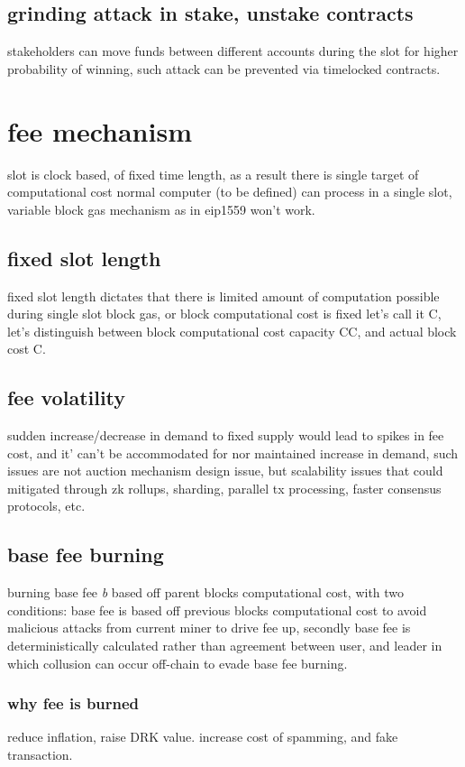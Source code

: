 \documentclass[a4paper]{article}
\begin{document}
\label{timelocked}
\subsection {grinding attack in stake, unstake contracts}
stakeholders can move funds between different accounts during the slot for higher probability of winning, such attack can be prevented via timelocked contracts.


\section {fee mechanism}
slot is clock based, of fixed time length, as a result there is single target of computational cost normal computer (to be defined) can process in a single slot, variable block gas mechanism as in eip1559 won't work.

\subsection{ fixed slot length}
fixed slot length dictates that there is limited amount of computation possible during single slot block gas, or block computational cost is fixed let's call it C, let's distinguish between block computational cost capacity CC, and actual block cost C.

\subsection{fee volatility}
sudden increase/decrease in demand to fixed supply would lead to spikes in fee cost, and it' can't be accommodated for nor maintained increase in demand, such issues are not auction mechanism design issue, but scalability issues that could mitigated through zk rollups, sharding, parallel tx processing, faster consensus protocols, etc.

\subsection{ base fee burning}
burning base fee \emph{b} based off parent blocks computational cost, with two conditions: base fee is based off previous blocks computational cost to avoid malicious attacks from current miner to drive fee up, secondly base fee is deterministically calculated rather than agreement between user, and leader in which collusion can occur off-chain to evade base fee burning.

\subsubsection{ why fee is burned}
reduce inflation, raise DRK value.
increase cost of spamming, and fake transaction.
\end{document}
